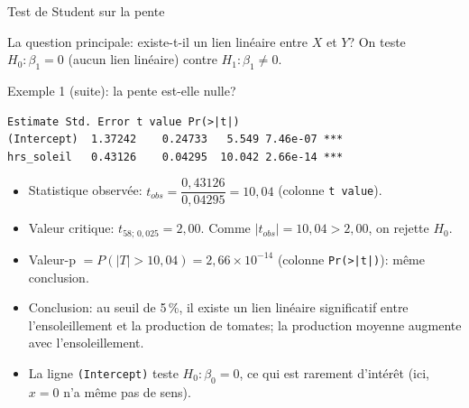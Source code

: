 \documentclass{BeamerTemplate}
\begin{document}
\begin{frame}[t]{Test de Student sur la pente}

La question principale: \alert{existe-t-il un lien linéaire} entre $X$ et $Y$?
On teste $H_0:\beta_1=0$ (aucun lien linéaire) contre $H_1:\beta_1\neq0$.



\end{frame}

\begin{frame}[fragile,t]{Exemple 1 (suite): la pente est-elle nulle?}

\begin{Verbatim}[fontsize=\scriptsize]
            Estimate Std. Error t value Pr(>|t|)
(Intercept)  1.37242    0.24733   5.549 7.46e-07 ***
hrs_soleil   0.43126    0.04295  10.042 2.66e-14 ***
\end{Verbatim}

\begin{itemize}\itemsep2.5mm
  \item<2-> Statistique observée: $t_{obs}=\dfrac{0{,}43126}{0{,}04295}=10{,}04$
  (colonne \texttt{t value}).
  \item<2-> Valeur critique: $t_{58;\,0{,}025}=2{,}00$. Comme $|t_{obs}|=10{,}04>2{,}00$,
  on \alert{rejette} $H_0$.
  \item<3-> Valeur-p $=P(|T|>10{,}04)=2{,}66\times10^{-14}$ (colonne
  \texttt{Pr(>|t|)}): même conclusion.
  \item<4-> \alert{Conclusion}: au seuil de 5\,\%, il existe un lien linéaire
  significatif entre l'ensoleillement et la production de tomates; la production
  moyenne \alert{augmente} avec l'ensoleillement.
  \item<4-> La ligne \texttt{(Intercept)} teste $H_0:\beta_0=0$, ce qui est rarement
  d'intérêt (ici, $x=0$ n'a même pas de sens).
\end{itemize}

\end{frame}
\end{document}
